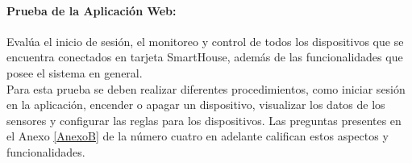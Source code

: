 \paragraph{Prueba de la Aplicación Web:} Evalúa el inicio de sesión, el monitoreo y control de todos los dispositivos que se encuentra conectados en tarjeta SmartHouse, además de las funcionalidades que posee el sistema en general.\\

Para esta prueba se deben realizar diferentes procedimientos, como iniciar sesión en la aplicación, encender o apagar un dispositivo, visualizar los datos de los sensores y configurar las reglas para los dispositivos. Las preguntas presentes en el Anexo \ref{AnexoB} de la número cuatro en adelante califican estos aspectos y funcionalidades.\\
